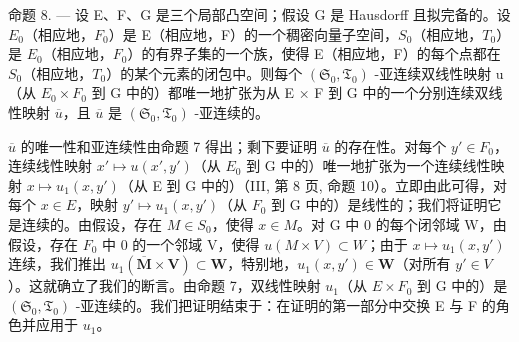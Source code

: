 命题 8. --- 设 E、F、G 是三个局部凸空间；假设 G 是 Hausdorff 且拟完备的。设 \(E_{0}\)（相应地，\(F_{0}\)）是 E（相应地，F）的一个稠密向量子空间，\(S_{0}\)（相应地，\(T_{0}\)）是 \(E_{0}\)（相应地，\(F_{0}\)）的有界子集的一个族，使得 E（相应地，F）的每个点都在 \(S_{0}\)（相应地，\(T_{0}\)）的某个元素的闭包中。则每个 \((\mathfrak{S}_{0}, \mathfrak{T}_{0})\) -亚连续双线性映射 u（从 \(E_{0} \times F_{0}\) 到 G 中的）都唯一地扩张为从 E × F 到 G 中的一个分别连续双线性映射 \(\overline{u}\)，且 \(\overline{u}\) 是 \((\mathfrak{S}_{0}, \mathfrak{T}_{0})\) -亚连续的。

\(\overline{u}\) 的唯一性和亚连续性由命题 7 得出；剩下要证明 \(\overline{u}\) 的存在性。对每个 \(y' \in F_{0}\)，连续线性映射 \(x' \mapsto u(x', y')\)（从 \(E_{0}\) 到 G 中的）唯一地扩张为一个连续线性映射 \(x \mapsto u_{1}(x, y')\)（从 E 到 G 中的）（III, 第 8 页, 命题 10）。立即由此可得，对每个 \(x \in E\)，映射 \(y' \mapsto u_{1}(x, y')\)（从 \(F_{0}\) 到 G 中的）是线性的；我们将证明它是连续的。由假设，存在 \(M \in S_{0}\)，使得 \(x \in M\)。对 G 中 0 的每个闭邻域 W，由假设，存在 \(F_{0}\) 中 0 的一个邻域 V，使得 \(u(M \times V) \subset W\)；由于 \(x \mapsto u_{1}(x, y')\) 连续，我们推出 \(u_{1}(\overline{\mathbf{M}} \times \mathbf{V}) \subset \mathbf{W}\)，特别地，\(u_{1}(x, y') \in \mathbf{W}\)（对所有 \(y' \in V\)）。这就确立了我们的断言。由命题 7，双线性映射 \(u_{1}\)（从 \(E \times F_{0}\) 到 G 中的）是 \((\mathfrak{S}_{0}, \mathfrak{T}_{0})\) -亚连续的。我们把证明结束于：在证明的第一部分中交换 E 与 F 的角色并应用于 \(u_{1}\)。
